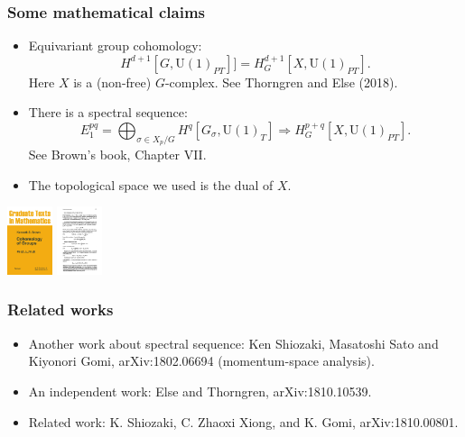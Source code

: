 \documentclass[xcolor=table, 10pt, aspectratio=43]{beamer}
\newcommand{\uone}{\mathrm U(1)}
\begin{document}
\begin{frame}
\frametitle{Some mathematical claims}
\begin{itemize}
\item Equivariant group cohomology:
\[H^{d+1}[G, \uone_{PT}]]=H^{d+1}_G[X, \uone_{PT}].\]
Here $X$ is a (non-free) $G$-complex. See Thorngren and Else (2018).
\item There is a spectral sequence:
\[E_1^{pq}=\bigoplus_{\sigma\in X_p/G}H^q[G_\sigma,\uone_T]\Rightarrow
H^{p+q}_G[X,\uone_{PT}].\]
See Brown's book, Chapter VII.
\item The topological space we used is the dual of $X$.
\end{itemize}
\begin{center}
	\includegraphics[height=2cm]{brown_book}
	\includegraphics[height=2cm]{brown_ss}
\end{center}
\end{frame}

\begin{frame}
\frametitle{Related works}
\begin{itemize}
\item Another work about spectral sequence: Ken Shiozaki, Masatoshi Sato and Kiyonori Gomi, arXiv:1802.06694 (momentum-space analysis).
\item An independent work: Else and Thorngren, arXiv:1810.10539.
\item Related work: K. Shiozaki, C. Zhaoxi Xiong, and K. Gomi,
arXiv:1810.00801.
\end{itemize}
\end{frame}
\end{document}
